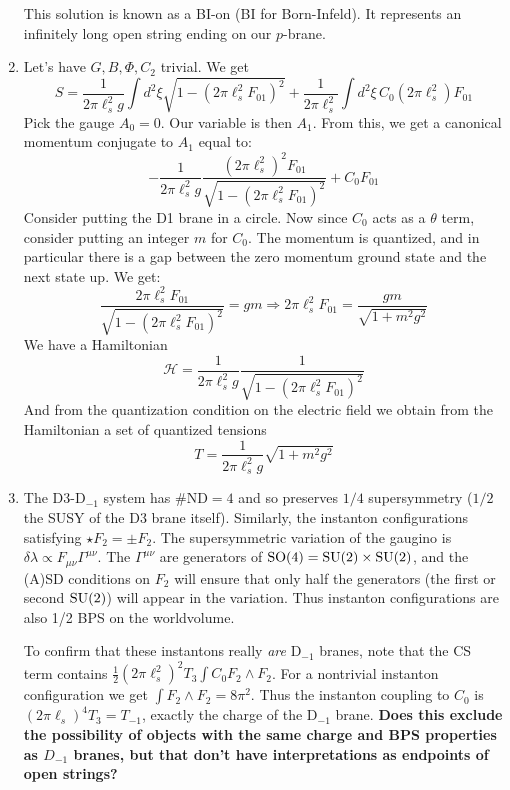 \documentclass[11pt, class=article, crop=false]{standalone}
\begin{document}
\begin{enumerate}
	This solution is known as a BI-on (BI for Born-Infeld). It represents an infinitely long open string ending on our $p$-brane. 
	
	\item Let's have $G, B, \Phi, C_2$ trivial. We get
	\[
		S = \frac{1}{2\pi \ell_s^2 g} \int d^2 \xi \sqrt{1-(2\pi \ell_s^2 F_{01})^2} + \frac{1}{2\pi \ell_s^2} \int d^2 \xi \, C_0 (2 \pi \ell_s^2) F_{01}
	\]
	Pick the gauge $A_0 = 0$. Our variable is then $A_1$. From this, we get a canonical momentum conjugate to $A_1$ equal to:
	\[
		-\frac{1}{2 \pi \ell_s^2 g} \frac{(2 \pi \ell_s^2)^2 F_{01}}{\sqrt{1-(2\pi \ell_s^2 F_{01})^2}} + C_0 F_{01}
	\]
	Consider putting the D1 brane in a circle. Now since $C_0$ acts as a $\theta$ term, consider putting an integer $m$ for $C_0$. The momentum is quantized, and in particular there is a gap between the zero momentum ground state and the next state up. We get:
	\[
		\frac{2\pi \ell_s^2 F_{01}}{\sqrt{1- (2 \pi \ell_s^2 F_{01})^2}} = g m \Rightarrow 2 \pi \ell_s^2 F_{01} = \frac{g m}{\sqrt{1 + m^2 g^2}}
	\]
	We have a Hamiltonian
	\[
		\mathcal H = \frac{1}{2 \pi \ell_s^2 g} \frac{1}{\sqrt{1-(2\pi \ell_s^2 F_{01})^2}} 
	\]
	And from the quantization condition on the electric field we obtain from the Hamiltonian a set of quantized tensions
	\[
		T = \frac{1}{2\pi \ell_s^2 g} \sqrt{1 + m^2 g^2}
	\]
	
	
	\item The D3-D$_{-1}$ system has $\#$ND$=4$ and so preserves $1/4$ supersymmetry ($1/2$ the SUSY of the D3 brane itself). Similarly, the instanton configurations satisfying $\star F_2 = \pm F_2$. The supersymmetric variation of the gaugino is $\delta \lambda \propto F_{\mu \nu} \Gamma^{\mu \nu}$. The $\Gamma^{\mu \nu}$ are generators of $\mathrm{SO}(4) = \mathrm{SU}(2) \times \mathrm{SU}(2)$, and the (A)SD conditions on $F_2$ will ensure that only half the generators (the first or second $\mathrm{SU}(2)$) will appear in the variation. Thus instanton configurations are also 1/2 BPS on the worldvolume.
	
	To confirm that these instantons really \emph{are} D$_{-1}$ branes, note that the CS term contains $\frac12 (2\pi \ell_s^2)^2 T_3 \int C_0 F_2 \wedge F_2$. For a nontrivial instanton configuration we get $\int F_2 \wedge F_2 = 8 \pi^2$. Thus the instanton coupling to $C_0$ is $(2 \pi \ell_s)^4 T_3 = T_{-1}$, exactly the charge of the D$_{-1}$ brane. \textbf{Does this exclude the possibility of objects with the same charge and BPS properties as $D_{-1}$ branes, but that don't have interpretations as endpoints of open strings?}
	

\end{enumerate}
\end{document}
